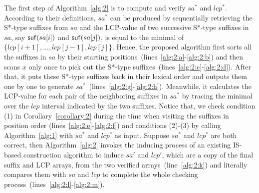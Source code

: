 \documentclass[10pt,journal,compsoc]{IEEEtran}
\begin{document}
The first step of Algorithm~\ref{alg:2} is to compute and verify $sa^*$ and $lcp^*$. According to their definitions, $sa^*$ can be produced by sequentially retrieving the S*-type suffixes from $sa$ and the LCP-value of two successive S*-type suffixes in $sa$, say ${\sf suf}(sa[i])$ and ${\sf suf}(sa[j])$, is equal to the minimal of $\{lcp[i + 1], ..., lcp[j - 1], lcp[j]\}$. Hence, the proposed algorithm first sorts all the suffixes in $sa$ by their starting positions~(lines~\ref{alg:2:a}-\ref{alg:2:b}) and then scans $x$ only once to pick out the S*-type suffixes~(lines~\ref{alg:2:c}-\ref{alg:2:d}). After that, it puts these S*-type suffixes back in their lexical order and outputs them one by one to generate $sa^*$~(lines~\ref{alg:2:g}-\ref{alg:2:h}). Meanwhile, it calculates the LCP-value for each pair of the neighboring suffixes in $sa^*$ by tracing the minimal over the $lcp$ interval indicated by the two suffixes. Notice that, we check condition (1) in Corollary~\ref{corollary:2} during the time when visiting the suffixes in position order (lines~\ref{alg:2:e}-\ref{alg:2:f}) and conditions (2)-(3) by calling Algorithm~\ref{alg:1} with $sa^*$ and $lcp^*$ as input. Suppose $sa^*$ and $lcp^*$ are both correct, then Algorithm~\ref{alg:2} invokes the inducing process of an existing IS-based construction algorithm to induce $sa'$ and $lcp'$, which are a copy of the final suffix and LCP arrays, from the two verified arrays~(line~\ref{alg:2:k}) and literally compares them with $sa$ and $lcp$ to complete the whole checking process~(lines~\ref{alg:2:l}-\ref{alg:2:m}).
\end{document}
